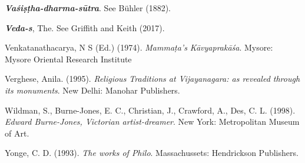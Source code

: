 \begin{thebibliography}{99}
{\sl\bfseries Vaśiṣṭha-dharma-sūtra}. See Bühler (1882).

{\sl\bfseries Veda-s}, The. See Griffith and Keith (2017).

Venkatanathacarya, N S (Ed.) (1974). {\sl Mammaṭa’s Kāvyaprakāśa}. Mysore: Mysore Oriental Research Institute

Verghese, Anila. (1995). {\sl Religious Traditions at Vijayanagara: as revealed through its monuments}. New  Delhi: Manohar Publishers. 

Wildman, S., Burne-Jones, E. C., Christian, J., Crawford, A., Des, C. L. (1998). {\sl Edward Burne-Jones, Victorian artist-dreamer}. New York: Metropolitan Museum of Art. 

Yonge, C. D. (1993). {\sl The works of Philo}. Massachussets: Hendrickson Publishers.
\end{thebibliography}
